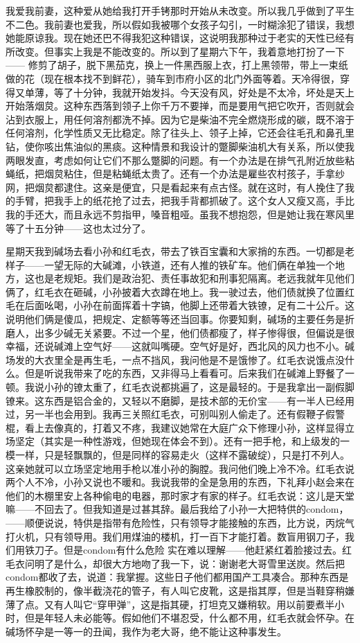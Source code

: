 我爱我前妻，这种爱从她给我打开手铐那时开始从未改变。所以我几乎做到了平生不二色。我前妻也爱我，所以假如我被哪个女孩子勾引，一时糊涂犯了错误，我想她能原谅我。现在她还巴不得我犯这种错误，这说明我那种过于老实的天性已经有所改变。但事实上我是不能改变的。所以到了星期六下午，我着意地打扮了一下—— 修剪了胡子，脱下黑茄克，换上一件黑西服上衣，打上黑领带，带上一束纸做的花（现在根本找不到鲜花），骑车到市府小区的北门外面等着。天冷得很，穿得又单薄，等了十分钟，我就开始发抖。今天没有风，好处是不太冷，坏处是天上开始落烟炱。这种东西落到领子上你千万不要掸，而是要用气把它吹开，否则就会沾到衣服上，用任何溶剂都洗不掉。因为它是柴油不完全燃烧形成的碳，既不溶于任何溶剂，化学性质又无比稳定。除了往头上、领子上掉，它还会往毛孔和鼻孔里钻，使你咳出焦油似的黑痰。这种情景和我设计的蹩脚柴油机大有关系，所以使我两眼发直，考虑如何让它们不那么蹩脚的问题。有一个办法是在排气孔附近放些粘蝇纸，把烟炱粘住，但是粘蝇纸太贵了。还有一个办法是雇些农村孩子，手拿纱网，把烟炱都逮住。这亲是便宜，只是看起来有点古怪。就在这时，有人挽住了我的手臂，把我手上的纸花抢了过去，把我手背都抓破了。这个女人又瘦又高，手比我的手还大，而且永远不剪指甲，嗓音粗哑。虽我不想抱怨，但是她让我在寒风里等了十五分钟——这也太过分了。 

星期天我到碱场去看小孙和红毛衣，带去了铁百宝囊和大家捎的东西。一切都是老样子——一望无际的大碱滩，小铁道，还有人推的铁矿车。他们俩在单独一个地方，这也是老规矩。我们是政治犯、责任事故犯和刑事犯隔离。老远我就年见他们俩了，红毛衣在砸碱，小孙披着大衣蹲在地上。我一驶过去，他们债就换了位置红毛在后面吆喝，小孙在前面挥着十字镐，他脚上还带着大铁镣，足有二十公斤。这说明他们俩是傻瓜，把规定、定额等等还当回事。你要知剩，碱场的主要任务是折磨人，出多少碱无关紧要。不过一个星，他们债都瘦了，样子惨得很，但偏说是很幸福，还说碱滩上空气好——这就叫嘴硬。空气好是好，西北风的风力也不小。碱场发的大衣里全是再生毛，一点不挡风，我问他是不是饿惨了。红毛衣说饿点没什么。但是听说我带来了吃的东西，又非得马上看看可。后来我们在碱滩上野餐了一顿。我说小孙的镣太重了，红毛衣说都挑遍了，这是最轻的。于是我拿出一副假脚镣来。这东西是铝合金的，又轻以不磨脚，是技术部的无价宝——有一半人已经用过，另一半也会用到。我再三关照红毛衣，可别叫别人偷走了。还有假鞭子假警棍，看上去像真的，打着又不疼，我建议她常在大庭广众下修理小孙，这样显得立场坚定（其实是一种性游戏，但她现在体会不到）。还有一把手枪，和上级发的一模一样，只是轻飘飘的，但是同样的容易走火（这样不露破绽），只是打不列人。这亲她就可以立场坚定地用手枪以准小孙的胸膛。我问他们晚上冷不冷。红毛衣说两个人不冷，小孙又说也不暖和。我说我带的全是急用的东西，下礼拜小赵会来在他们的木棚里安上各种偷电的电器，那时家才有家的样子。红毛衣说：这儿是天堂嘛——不回去了。但我知道是过甚其辞。最后我给了小孙一大把特供的condom，——顺便说说，特供是指带有危险性，只有领导才能接触的东西，比方说，丙烷气打火机，只有领导用。我们用煤油的楼机，打一百下才能打着。数盲用钢刀子，我们用铁刀子。但是condom有什么危险 实在难以理解——他赶紧红着脸接过去。红毛衣问明了是什么，却很大方地吻了我一下，说：谢谢老大哥雪里送炭。然后把condom都收了去，说道：我掌握。这些日子他们都用国产工具凑合。那种东西是再生橡胶制的，像半截浇花的管子，有人叫它皮靴，这是指其厚，但是当鞋穿稍嫌薄了点。又有人叫它“穿甲弹”，这是指其硬，打坦克又嫌稍软。用以前要煮半小时，但是年轻人未必能等。假如他们不堪忍受，什么都不用，红毛衣就会怀孕。在碱场怀孕是一等一的丑闻，我作为老大哥，绝不能让这种事发生。 

